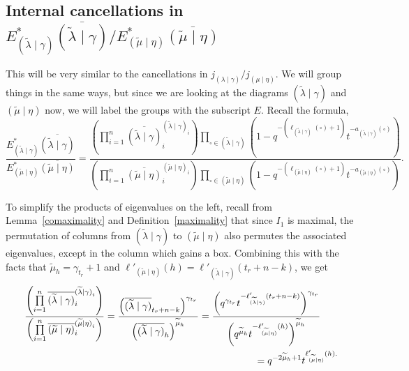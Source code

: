 \documentclass[ALCO]{cedram}
\newcommand{\Estar}[1]{E^*_{#1}}
\newcommand{\nudom}{{( \lambda \mid \gamma )}}
\newcommand{\lambdagamma}{{\nudom}}
\newcommand{\mueta}{{(\mu \mid \eta)}}
\newcommand{\mutilde}{{\widetilde{\mu}}}
\newcommand{\lambdatilde}{{\widetilde{\lambda}}}
\newcommand{\lambdatildegamma}{{(\lambdatilde \mid \gamma)}}
\newcommand{\mutildeeta}{{(\mutilde \mid \eta)}}
\begin{document}
\subsection{\texorpdfstring{Internal cancellations in $\Estar{\lambdatildegamma}\overline{\lambdatildegamma}/\Estar{\mutildeeta}\overline{\mutildeeta}$}{Internal cancellations in E-star quotient}} This will be very similar to the cancellations in $j_\lambdagamma/j_\mueta$. We will group things in the same ways, but since we are looking at the diagrams $\lambdatildegamma$ and $\mutildeeta$ now, we will label the groups with the subscript $E$. Recall the formula,
\[ \frac{\Estar{\lambdatildegamma}\overline{\lambdatildegamma}}{\Estar{\mutildeeta}\overline{\mutildeeta}} = \frac{\left( \prod\limits_{i=1}^n \overline{\lambdatildegamma}_i^{\lambdatildegamma_i} \right) \prod\limits_{\square \in \lambdatildegamma} \left(1-q^{-(\ell_\lambdatildegamma(\square)+1)} t^{-a_\lambdatildegamma(\square)}\right)}{\left( \prod\limits_{i=1}^n \overline{\mutildeeta}_i^{\mutildeeta_i} \right) \prod\limits_{\square \in \mutildeeta} \left(1-q^{-(\ell_\mutildeeta(\square)+1)} t^{-a_\mutildeeta(\square)}\right)}.\]

To simplify the products of eigenvalues on the left, recall from Lemma~\ref{comaximality} and Definition~\ref{maximality} that since $I_1$ is maximal, the permutation of columns from $\lambdatildegamma$ to $\mutildeeta$ also permutes the associated eigenvalues, except in the column which gains a box. Combining this with the facts that $\mutilde_h = \gamma_{t_r}+1$ and $\ell'_{\mutildeeta}(h) = \ell'_{\lambdatildegamma}(t_r+n-k)$, we get
\begin{align*}
    \frac{\left( \prod\limits_{i=1}^n \overline{\lambdatildegamma}_i^{\lambdatildegamma_i} \right) }{\left( \prod\limits_{i=1}^n \overline{\mutildeeta}_i^{\mutildeeta_i} \right) } = \frac{\left(\overline{\lambdatildegamma}_{t_r+n-k}\right)^{\gamma_{t_r}}}{\left(\overline{\lambdatildegamma}_{h}\right)^{\mutilde_{h}}} 
    &= \frac{\left(q^{\gamma_{t_r}}t^{-\ell'_{\lambdatildegamma}(t_r+n-k)}\right)^{\gamma_{t_r}}}{\left(q^{\mutilde_h}t^{-\ell'_{\mutildeeta}(h)}\right)^{\mutilde_h}} \\&\hspace*{2cm}= q^{-2\mutilde_h+1}t^{\ell'_{\mutildeeta}(h).}
\end{align*} 
\end{document}
